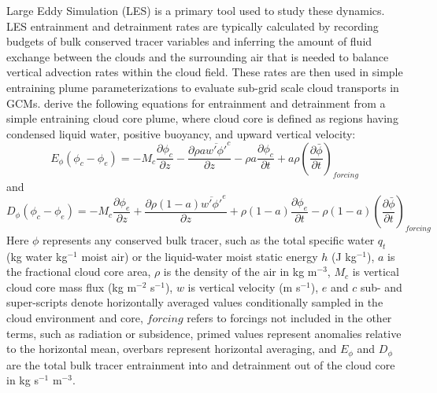 \documentclass[draft,grl]{agutex}
\begin{document}
\begin{article}
Large Eddy Simulation (LES) is a primary tool used to study these dynamics.  
LES entrainment and detrainment rates are typically calculated by recording 
budgets of bulk conserved tracer variables and inferring the amount of fluid 
exchange between the clouds and the surrounding air that is needed to balance 
vertical advection rates within the cloud field.  These rates are then used in 
simple entraining plume parameterizations to evaluate sub-grid scale cloud 
transports in GCMs.  \cite{Siebesma1995} derive the following equations for 
entrainment and detrainment from a simple entraining cloud core plume, where 
cloud core is defined as regions having condensed liquid water, positive 
buoyancy, and upward vertical velocity:
\begin{equation}
  \label{eq:siebesma_entrainment}
    E_{\phi}(\phi_c - \phi_e) = - M_c \frac{\partial \phi_c}{\partial z}
        - \frac{\partial \rho a \overline{w' \phi'}^c}{\partial z}
        - \rho a \frac{\partial \phi_c}{\partial t}
        + a \rho \left(\frac{\partial \bar{\phi}}{\partial t}\right)_{forcing}
\end{equation}
and
\begin{equation}
  \label{eq:siebesma_detrainment}
    D_{\phi}(\phi_c - \phi_e) = - M_c \frac{\partial \phi_e}{\partial z}
        + \frac{\partial \rho (1 - a) \overline{w' \phi'}^e}{\partial z}
        + \rho (1-a) \frac{\partial \phi_e}{\partial t}
     - \rho (1-a) \left(\frac{\partial \bar{\phi}}{\partial t}\right)_{forcing}
\end{equation}
Here $\phi$ represents any conserved bulk tracer, such as the total specific 
water $q_t$ (kg water kg$^{-1}$ moist air) or the liquid-water moist static 
energy $h$ (J kg$^{-1}$), $a$ is the fractional cloud core area, $\rho$ is the 
density of the air in kg m$^{-3}$, $M_c$ is vertical cloud core mass flux 
(kg m$^{-2}$ s$^{-1}$), $w$ is vertical velocity (m s$^{-1}$), $e$ and $c$ sub- 
and super-scripts denote horizontally averaged values conditionally sampled in 
the cloud environment and core, $forcing$ refers to forcings not included in 
the other terms, such as radiation or subsidence, primed values represent 
anomalies relative to the horizontal mean, overbars represent horizontal 
averaging, and $E_{\phi}$ and $D_{\phi}$ are the total bulk tracer entrainment 
into and detrainment out of the cloud core in kg s$^{-1}$ m$^{-3}$.  


\end{article}
\end{document}
